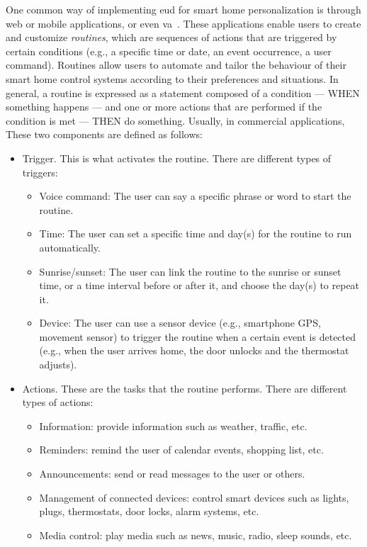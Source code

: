 One common way of implementing \acrshort{eud} for smart home personalization is through web or mobile applications, or even \acrfull{va}~\parencite{barricelliVirtualAssistantsPersonalizing2021,arditoSmartObjectsSmart2018}. These applications enable users to create and customize \textit{routines}, which are sequences of actions that are triggered by certain conditions (e.g., a specific time or date, an event occurrence, a user command). Routines allow users to automate and tailor the behaviour of their smart home control systems according to their preferences and situations. In general, a routine is expressed as a statement composed of a condition --- WHEN something happens --- and one or more actions that are performed if the condition is met --- THEN do something. Usually, in commercial applications, These two components are defined as follows:
\begin{itemize}
    \item Trigger. This is what activates the routine. There are different types of triggers:
        \begin{itemize}
            \item Voice command: The user can say a specific phrase or word to start the routine.
            \item Time: The user can set a specific time and day(s) for the routine to run automatically. 
            \item Sunrise/sunset: The user can link the routine to the sunrise or sunset time, or a time interval before or after it, and choose the day(s) to repeat it.
            \item Device: The user can use a sensor device (e.g., smartphone GPS, movement sensor) to trigger the routine when a certain event is detected (e.g., when the user arrives home, the door unlocks and the thermostat adjusts).
        \end{itemize}
    \item Actions. These are the tasks that the routine performs. There are different types of actions:
        \begin{itemize}
            \item Information: provide information such as weather, traffic, etc.
            \item Reminders: remind the user of calendar events, shopping list, etc.
            \item Announcements: send or read messages to the user or others.
            \item Management of connected devices: control smart devices such as lights, plugs, thermostats, door locks, alarm systems, etc.
            \item Media control: play media such as news, music, radio, sleep sounds, etc.
        \end{itemize}
\end{itemize}

